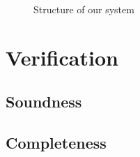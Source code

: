 \documentclass{llncs}
\begin{document}
\begin{figure}

\label{fig:cons}
\caption{Structure of our system}
\end{figure}
\begin{figure}

\end{figure}
\begin{figure}

\end{figure}
\begin{figure}

\end{figure}
\begin{figure}

\end{figure}


\section{Verification}
\subsection{Soundness}
\subsection{Completeness}
\end{document}
